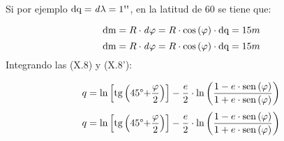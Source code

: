 \documentclass{tufte-book}
\newcommand\normalsubformula[1]{\text{\mathversion{normal}$#1$}}
\begin{document}
Si por ejemplo  ${\normalsubformula{\text{dq}}=\mathit{d\lambda
}=1\text{{\textquotesingle}{\textquotesingle}}}$, en la latitud de
60{\textdegree} se tiene que:

\begin{equation*}
{\normalsubformula{\text{dm}}=R\cdot \mathit{d\varphi }=R\cdot
\text{cos}\left(\varphi \right)\cdot
\normalsubformula{\text{dq}}=\text{15}m}
\end{equation*}
\begin{equation*}
{\normalsubformula{\text{dm}}=R\cdot \mathit{d\varphi }=R\cdot
\text{cos}\left(\varphi \right)\cdot
\normalsubformula{\text{dq}}=\text{15}m}
\end{equation*}
Integrando las (X.8) y (X.8{\textquoteright}):

\begin{equation*}
{q=\text{ln}\left[\normalsubformula{\text{tg}}\left(\text{45}\text{{\textdegree}+}\frac{\varphi
}{2}\right)\right]-\frac{e}{2}\cdot \text{ln}\left(\frac{1-e\cdot
\normalsubformula{\text{sen}}\left(\varphi \right)}{1+e\cdot
\normalsubformula{\text{sen}}\left(\varphi \right)}\right)}
\end{equation*}
\begin{equation*}
{q=\text{ln}\left[\normalsubformula{\text{tg}}\left(\text{45}\text{{\textdegree}+}\frac{\varphi
}{2}\right)\right]-\frac{e}{2}\cdot \text{ln}\left(\frac{1-e\cdot
\normalsubformula{\text{sen}}\left(\varphi \right)}{1+e\cdot
\normalsubformula{\text{sen}}\left(\varphi \right)}\right)}
\end{equation*}
\end{document}
